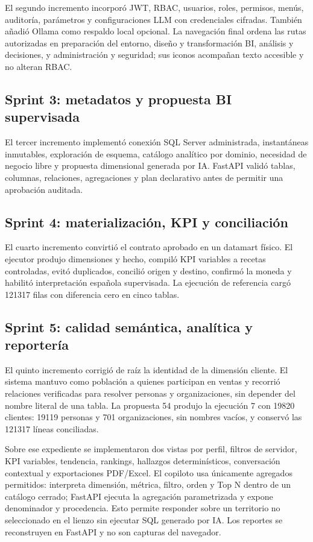\documentclass[11pt,letterpaper]{article}
\begin{document}
El segundo incremento incorporó JWT, RBAC, usuarios, roles, permisos, menús, auditoría, parámetros y configuraciones LLM con credenciales cifradas. También añadió Ollama como respaldo local opcional. La navegación final ordena las rutas autorizadas en preparación del entorno, diseño y transformación BI, análisis y decisiones, y administración y seguridad; sus iconos acompañan texto accesible y no alteran RBAC.

\subsection{Sprint 3: metadatos y propuesta BI supervisada}

El tercer incremento implementó conexión SQL Server administrada, instantáneas inmutables, exploración de esquema, catálogo analítico por dominio, necesidad de negocio libre y propuesta dimensional generada por IA. FastAPI validó tablas, columnas, relaciones, agregaciones y plan declarativo antes de permitir una aprobación auditada.

\subsection{Sprint 4: materialización, KPI y conciliación}

El cuarto incremento convirtió el contrato aprobado en un datamart físico. El ejecutor produjo dimensiones y hecho, compiló KPI variables a recetas controladas, evitó duplicados, concilió origen y destino, confirmó la moneda y habilitó interpretación española supervisada. La ejecución de referencia cargó 121317 filas con diferencia cero en cinco tablas.

\subsection{Sprint 5: calidad semántica, analítica y reportería}

El quinto incremento corrigió de raíz la identidad de la dimensión cliente. El sistema mantuvo como población a quienes participan en ventas y recorrió relaciones verificadas para resolver personas y organizaciones, sin depender del nombre literal de una tabla. La propuesta 54 produjo la ejecución 7 con 19820 clientes: 19119 personas y 701 organizaciones, sin nombres vacíos, y conservó las 121317 líneas conciliadas.

Sobre ese expediente se implementaron dos vistas por perfil, filtros de servidor, KPI variables, tendencia, rankings, hallazgos determinísticos, conversación contextual y exportaciones PDF/Excel. El copiloto usa únicamente agregados permitidos: interpreta dimensión, métrica, filtro, orden y Top N dentro de un catálogo cerrado; FastAPI ejecuta la agregación parametrizada y expone denominador y procedencia. Esto permite responder sobre un territorio no seleccionado en el lienzo sin ejecutar SQL generado por IA. Los reportes se reconstruyen en FastAPI y no son capturas del navegador.
\end{document}
